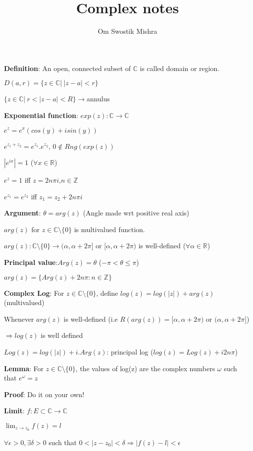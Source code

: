 \documentclass{article}
\title{Complex notes}
\author{Om Swostik Mishra}
\date{}
\begin{document}
\maketitle

\begin{flushleft}
\textbf{Definition}: An open, connected subset of $\mathds{C}$ is called domain or region.

$D(a,r)=\{z\in \mathds{C}|\: |z-a|<r\}$

$\{z\in \mathds{C}|\:r<|z-a|<R\}$$\rightarrow$annulus

\textbf{Exponential function}: $exp(z):\mathds{C}\rightarrow\mathds{C}$

$e^z=e^x(cos(y)+isin(y))$

$e^{z_1+z_2}=e^{z_1}.e^{z_2}$, $0\notin Rng(exp(z))$

$|e^{ix}|=1$ ($\forall x\in \mathds{R}$)

$e^{z}=1$ iff $z=2n\pi i$,$n\in \mathds{Z}$

$e^{z_1}=e^{z_2}$ iff $z_1=z_2+2n\pi i$

\textbf{Argument}: 
$\theta=arg(z)$ (Angle made wrt positive real axis)

$arg(z)$ for $z\in \mathds{C}\setminus \{0\}$ is multivalued function.

$arg(z): \mathds{C}\setminus \{0\}\rightarrow (\alpha,\alpha+2\pi]$ or $[\alpha,\alpha+2\pi)$ is well-defined ($\forall \alpha \in \mathds{R}$)

\textbf{Principal value}:$Arg(z)=\theta$  ($-\pi<\theta\leq \pi$)

$arg(z)=\{Arg(z)+2n\pi:n\in \mathds{Z}\}$

\textbf{Complex Log}: For $z\in \mathds{C}\setminus \{0\}$, define $log(z)=log(|z|)+arg(z)$ (multivalued)

Whenever $arg(z)$ is well-defined (i.e $R(arg(z))=[\alpha,\alpha+2\pi)$ or $(\alpha,\alpha+2\pi]$)

$\Rightarrow log(z)$ is well defined

$Log(z)=log(|z|)+i.Arg(z)$: principal log ($log(z)=Log(z)+i2n\pi$)

\textbf{Lemma}: For $z\in \mathds{C}\setminus \{0\}$, the values of log(z) are the complex numbers $\omega$ such that $e^{\omega}=z$

\textbf{Proof}: Do it on your own!

\textbf{Limit}: $f: E\subset\mathds{C} \rightarrow \mathds{C}$

$\lim_{z \to z_0} f(z)=l$ 

$\forall \epsilon>0,\exists \delta>0$ such that $0<|z-z_0|<\delta \Rightarrow |f(z)-l|<\epsilon$ 


\end{flushleft}
\end{document}
